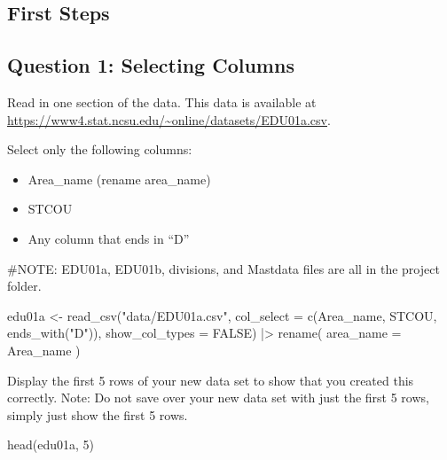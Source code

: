 \documentclass[
  letterpaper,
  DIV=11,
  numbers=noendperiod]{scrartcl}
\newenvironment{Shaded}{\begin{snugshade}}{\end{snugshade}}
\newcommand{\AttributeTok}[1]{\textcolor[rgb]{0.40,0.45,0.13}{#1}}
\newcommand{\CommentTok}[1]{\textcolor[rgb]{0.37,0.37,0.37}{#1}}
\newcommand{\ConstantTok}[1]{\textcolor[rgb]{0.56,0.35,0.01}{#1}}
\newcommand{\DecValTok}[1]{\textcolor[rgb]{0.68,0.00,0.00}{#1}}
\newcommand{\FunctionTok}[1]{\textcolor[rgb]{0.28,0.35,0.67}{#1}}
\newcommand{\NormalTok}[1]{\textcolor[rgb]{0.00,0.23,0.31}{#1}}
\newcommand{\OtherTok}[1]{\textcolor[rgb]{0.00,0.23,0.31}{#1}}
\newcommand{\SpecialCharTok}[1]{\textcolor[rgb]{0.37,0.37,0.37}{#1}}
\newcommand{\StringTok}[1]{\textcolor[rgb]{0.13,0.47,0.30}{#1}}
\begin{document}
\subsection{First Steps}\label{first-steps}

\subsection{Question 1: Selecting
Columns}\label{question-1-selecting-columns}

Read in one section of the data. This data is available at
\url{https://www4.stat.ncsu.edu/~online/datasets/EDU01a.csv}.

Select only the following columns:

\begin{itemize}
\item
  Area\_name (rename area\_name)
\item
  STCOU
\item
  Any column that ends in ``D''
\end{itemize}

\begin{Shaded}
\begin{Highlighting}[]
\CommentTok{\#NOTE: EDU01a, EDU01b, divisions, and Mastdata files are all in the project folder. }

\NormalTok{edu01a }\OtherTok{\textless{}{-}} \FunctionTok{read\_csv}\NormalTok{(}\StringTok{"data/EDU01a.csv"}\NormalTok{, }
                   \AttributeTok{col\_select =} \FunctionTok{c}\NormalTok{(Area\_name, STCOU, }\FunctionTok{ends\_with}\NormalTok{(}\StringTok{"D"}\NormalTok{)),}
                    \AttributeTok{show\_col\_types =} \ConstantTok{FALSE}\NormalTok{) }\SpecialCharTok{|\textgreater{}}
  \FunctionTok{rename}\NormalTok{(}
    \AttributeTok{area\_name =}\NormalTok{ Area\_name}
\NormalTok{  )}
\end{Highlighting}
\end{Shaded}

Display the first 5 rows of your new data set to show that you created
this correctly. Note: Do not save over your new data set with just the
first 5 rows, simply just show the first 5 rows.

\begin{Shaded}
\begin{Highlighting}[]
\FunctionTok{head}\NormalTok{(edu01a, }\DecValTok{5}\NormalTok{)}
\end{Highlighting}
\end{Shaded}
\end{document}
